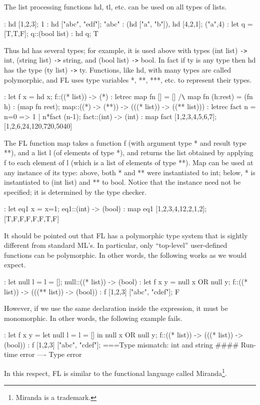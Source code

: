 The list processing functions hd, tl, etc. can be used on all types of lists.
\begin{hol}
: hd [1,2,3];
1
: hd ["abc", "edf"];
"abc"
: (hd ["a", "b"]), hd [4,2,1];
("a",4)
: let q = [T,T,F];
q::(bool list)
: hd q;
T
\end{hol}
Thus hd has several types; for example, it is used above with types
(int list) \verb!->! int,
(string list) \verb!->! string, and (bool list) \verb!->! bool.
In fact if ty is any type then hd has the type (ty list) \verb!->! ty.
Functions, like hd, with many types are called polymorphic,
and FL uses type variables *, **, ***, etc. to represent their types.
\begin{hol}
: let f x = hd x;
f::((* list)) -> (*)
: letrec map fn [] = []
   /\verb!\!    map fn (h:rest) = (fn h) : (map fn rest);
map::((*) -> (**)) -> (((* list)) -> ((** list)))
: letrec fact n = n=0 => 1 | n*fact (n-1);
fact::(int) -> (int)
: map fact [1,2,3,4,5,6,7];
[1,2,6,24,120,720,5040]
\end{hol}
The FL function map takes a function f (with argument type * and result
type **), and a list l
(of elements of type *), and returns the list obtained by applying
f to each element of l
(which is a list of elements of type **). Map can be used at any instance
of its type: above, both *
and ** were instantiated to int; below, * is instantiated to (int list)
and ** to bool. Notice that the
instance need  not be  specified; it is determined by the type checker.
\begin{hol}
: let eq1 x = x=1;
eq1::(int) -> (bool)
: map eq1 [1,2,3,4,12,2,1,2];
[T,F,F,F,F,F,T,F]
\end{hol}

It should be pointed out that FL has a polymorphic type system that
is sightly different from
standard ML's. In particular, only ``top-level'' user-defined functions
can be polymorphic. In
other words, the following works as we would expect.
\begin{hol}
: let null l = l = [];
null::((* list)) -> (bool)
: let f x y = null x OR null y;
f::((* list)) -> (((** list)) -> (bool))
: f [1,2,3] ["abc", "cdef"];
F
\end{hol}
However, if we use the same declaration inside the expression, it must
be monomorphic. In other
words, the following example fails.
\begin{hol}
: let f x y =
    let null l = l = [] in
    null x OR null y;
f::((* list)) -> (((* list)) -> (bool))
: f [1,2,3] ["abc", "cdef"];
===Type mismatch: int and string
#### Run-time error
---- Type error
\end{hol}
In this respect, FL is similar to the functional language called
Miranda\footnote{Miranda is a trademark.}\cite{Miranda}.

